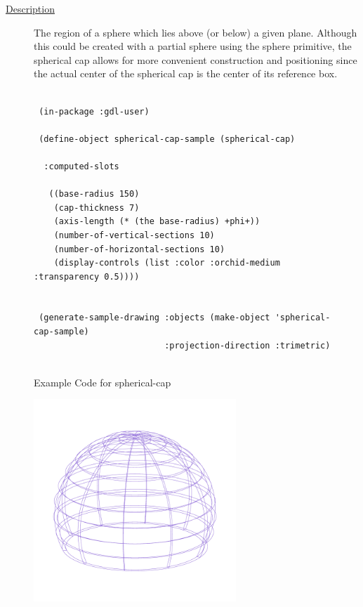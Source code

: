 \documentclass [11pt]{book}
\begin{document}
\begin{itemize}
\begin{description}
\item [
\underline{Description}]


The region of a sphere which lies above (or below) a given plane. Although this
could be created with a partial sphere using the sphere primitive, the spherical cap allows for more convenient
construction and positioning since the actual center of the spherical cap is the center of its reference box.



\end{description}




\begin{figure}
\begin{lrbox}{\boxedverb}
\begin{minipage}{\linewidth}
{\small

\begin{verbatim}
  
 (in-package :gdl-user)

 (define-object spherical-cap-sample (spherical-cap)
   
  :computed-slots

   ((base-radius 150)
    (cap-thickness 7)
    (axis-length (* (the base-radius) +phi+))
    (number-of-vertical-sections 10)
    (number-of-horizontal-sections 10)
    (display-controls (list :color :orchid-medium :transparency 0.5))))
  

 (generate-sample-drawing :objects (make-object 'spherical-cap-sample) 
                          :projection-direction :trimetric)
                  

\end{verbatim}}
\end{minipage}
\end{lrbox}
\fbox{\usebox{\boxedverb}}

\caption{Example Code for spherical-cap}

\label{fig:example-code-spherical-cap}

\end{figure}

\begin{figure}
\begin{center}
\includegraphics[width=3in,height=3in]{../images/example-spherical-cap.pdf}
\end{center}


\end{figure}
\end{itemize}
\end{document}
